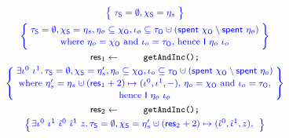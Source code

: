 \begin{figure}
\centering
%    
\[
\!\!\!
{\small{
\begin{array}{c}
  \spec{\!\!
  \begin{array}{c}
    \tkns = \emptyset,
    \hists = \gists
  \end{array}
  \!\!}
\\\\[-6pt]
\spec{\!\!
  \begin{array}{c}
    \tkns = \emptyset,
    \hists = \gists,
    \gisto \subseteq \histo,
    \ikno \subseteq \tkno \hunion (\Tomb~\histo \setminus \Tomb~\gisto)\\[2pt]
    \mbox{where $\gisto = \histo$ and $\ikno = \tkno$, hence $\Ic{\gisto}{\ikno}$}
  \end{array}
  \!\!}
\\\\[-6pt]
\res_1 \Asgn \esc{getAndInc();}
\\[3pt]
\spec{\!\!
\begin{array}{c}
   \exists \ikn^0~\ikn^1 \ldot 
   \tkns = \emptyset, \hists = \gists', \gisto \subseteq \histo, \ikno \subseteq \tkno \hunion (\Tomb~\histo \setminus \Tomb~\gisto)\\[2pt]
   \mbox{where $\gists' = \gists \hunion (\res_1 + 2) \hpts (\ikn^0,
     \ikn^1, -)$, $\gisto = \histo$ and $\ikno = \tkno$,}\\[2pt]
   \mbox{hence $\Ic{\gisto}{\ikno}$}
  \end{array}
  \!\!}%
\\\\[-5pt] 
\res_2 \Asgn \esc{getAndInc();}
\\[3pt]
\spec{\!\!\!
\begin{array}{c}
  \exists \ikn^0~\ikn^1~\iknh^0~\iknh^1~z \ldot     
  \tkns = \emptyset, \hists = \gists' \hunion (\res_2+2) \mapsto (\iknh^0, \iknh^1, z),\\[2pt]

\end{array}}
\end{array}}}\]
\end{figure}
